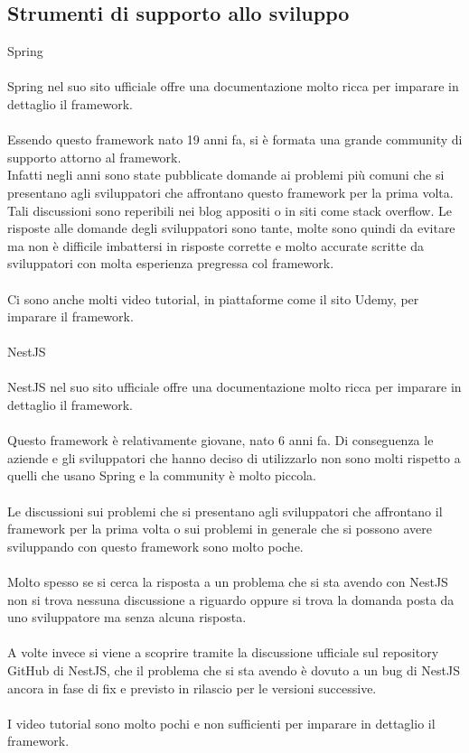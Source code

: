 \subsection{Strumenti di supporto allo sviluppo}
Spring
\\\\
Spring nel suo sito ufficiale offre una documentazione molto ricca per imparare in dettaglio il framework.
\\\\
Essendo questo framework nato 19 anni fa, si è formata una grande community di supporto attorno al framework. 
\\
Infatti negli anni sono state pubblicate domande ai problemi più comuni che si presentano agli sviluppatori
che affrontano questo framework per la prima volta. 
\\
Tali discussioni sono reperibili nei blog appositi o in siti come stack overflow. Le risposte alle domande
degli sviluppatori sono tante, molte sono quindi da evitare ma non è difficile imbattersi in risposte
corrette e molto accurate scritte da sviluppatori con molta esperienza pregressa col framework.
\\\\
Ci sono anche molti video tutorial, in piattaforme come il sito Udemy, per imparare il framework.
\\\\
NestJS
\\\\
NestJS nel suo sito ufficiale offre una documentazione molto ricca per imparare in dettaglio il framework.
\\\\
Questo framework è relativamente giovane, nato 6 anni fa. Di conseguenza le aziende e gli sviluppatori che hanno
deciso di utilizzarlo non sono molti rispetto a quelli che usano Spring e la community è molto piccola.
\\\\
Le discussioni sui problemi che si presentano agli sviluppatori che affrontano il framework per la prima volta
o sui problemi in generale che si possono avere sviluppando con questo framework sono molto poche. 
\\\\
Molto spesso se si cerca la risposta a un problema che si sta avendo con NestJS non si trova nessuna discussione
a riguardo oppure si trova la domanda posta da uno sviluppatore ma senza alcuna risposta.
\\\\
A volte invece si viene a scoprire tramite la discussione ufficiale sul repository GitHub di NestJS, che il 
problema che si sta avendo è dovuto a un bug di NestJS ancora in fase di fix e previsto in rilascio per le versioni
successive.
\\\\
I video tutorial sono molto pochi e non sufficienti per imparare in dettaglio il framework.

